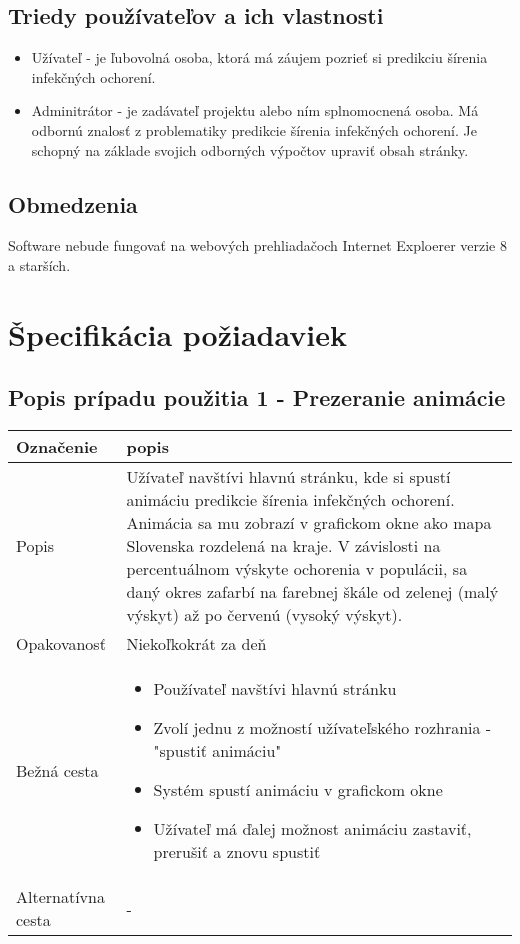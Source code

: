 \documentclass[12pt,a4paper]{report}
\begin{document}
\section[Triedy používateľov a ich vlastnosti]{\rmfamily\bfseries
	Triedy používateľov a ich vlastnosti}
\begin{itemize}
	\item Užívateľ - je ľubovolná osoba, ktorá má záujem pozrieť si predikciu šírenia infekčných ochorení.
	\item Adminitrátor - je zadávateľ projektu alebo ním splnomocnená osoba. Má odbornú znalosť z problematiky predikcie šírenia infekčných ochorení. Je schopný
na základe svojich odborných výpočtov upraviť obsah stránky.
\end{itemize}

\section[Obmedzenia]{\rmfamily\bfseries
	Obmedzenia}
	Software nebude fungovať na webových prehliadačoch Internet Exploerer verzie 8 a starších. 

\renewcommand{\chaptername}{}	
\chapter[Špecifikácia požiadaviek]{\rmfamily\bfseries
	Špecifikácia požiadaviek}
\section[Popis prípadu použitia 1 - Prezeranie animácie]{\rmfamily\bfseries
	Popis prípadu použitia 1 - Prezeranie animácie}
\begin{table}[h!]
	\centering
	\begin{tabular}{|>{\centering\arraybackslash}m{1in}|>{\centering\arraybackslash}m{1in}|}
		\hline
		\centering Označenie & popis \\ [0ex]
		\hline
		Popis & Užívateľ navštívi hlavnú stránku, kde si spustí animáciu predikcie šírenia infekčných ochorení. Animácia sa mu
		zobrazí v grafickom okne ako mapa Slovenska rozdelená na kraje. V závislosti na percentuálnom výskyte ochorenia
		v populácii, sa daný okres zafarbí na farebnej škále od zelenej (malý výskyt) až po červenú (vysoký výskyt).\\ [0ex]
		\hline
		Opakovanosť & Niekoľkokrát za deň \\ [0ex]
		\hline
		Bežná cesta & 	\begin{itemize}
							\item Používateľ navštívi hlavnú stránku 
							\item Zvolí jednu z možností užívateľského rozhrania - "spustiť animáciu"
							\item Systém spustí animáciu v grafickom okne
							\item Užívateľ má ďalej možnost animáciu zastaviť, prerušiť a znovu spustiť
						\end{itemize} \\ [0ex]
		\hline
		Alternatívna cesta & - \\ [0ex]
		\hline
	\end{tabular}
\end{table}
\end{document}
